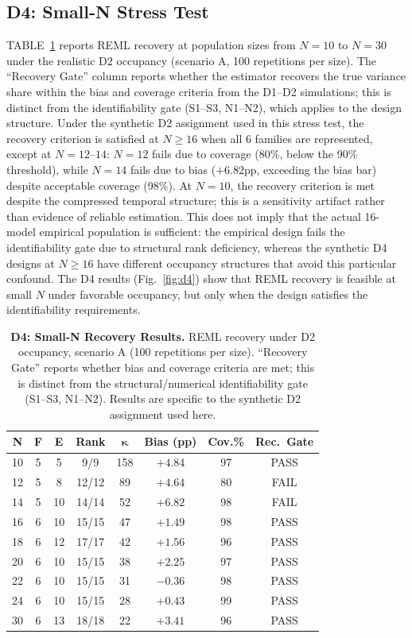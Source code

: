 \documentclass[11pt]{article}
\theoremstyle{definition}
\theoremstyle{plain}
\begin{document}
\subsection{D4: Small-N Stress Test}
TABLE~\ref{tab:d4} reports REML recovery at population sizes from $N = 10$ to $N = 30$ under the realistic D2 occupancy (scenario A, 100 repetitions per size). The ``Recovery Gate'' column reports whether the estimator recovers the true variance share within the bias and coverage criteria from the D1--D2 simulations; this is distinct from the identifiability gate (S1--S3, N1--N2), which applies to the design structure. Under the synthetic D2 assignment used in this stress test, the recovery criterion is satisfied at $N \geq 16$ when all 6 families are represented, except at $N = 12$--$14$: $N = 12$ fails due to coverage (80\%, below the 90\% threshold), while $N = 14$ fails due to bias ($+6.82$pp, exceeding the bias bar) despite acceptable coverage (98\%). At $N = 10$, the recovery criterion is met despite the compressed temporal structure; this is a sensitivity artifact rather than evidence of reliable estimation. This does not imply that the actual 16-model empirical population is sufficient: the empirical design fails the identifiability gate due to structural rank deficiency, whereas the synthetic D4 designs at $N \geq 16$ have different occupancy structures that avoid this particular confound. The D4 results (Fig.~\ref{fig:d4}) show that REML recovery is feasible at small $N$ under favorable occupancy, but only when the design satisfies the identifiability requirements.

\begin{table}[!htbp]
\caption{\textbf{D4: Small-N Recovery Results.} REML recovery under D2 occupancy, scenario A (100 repetitions per size). ``Recovery Gate'' reports whether bias and coverage criteria are met; this is distinct from the structural/numerical identifiability gate (S1--S3, N1--N2). Results are specific to the synthetic D2 assignment used here.}
\label{tab:d4}
\centering
\footnotesize
\begin{tabular}{c c c c c c c c}
\hline
\textbf{N} & \textbf{F} & \textbf{E} & \textbf{Rank} & $\boldsymbol{\kappa}$ & \textbf{Bias (pp)} & \textbf{Cov.\%} & \textbf{Rec.\ Gate} \\
\hline
10 & 5 & 5 & 9/9 & 158 & $+4.84$ & 97 & PASS \\
\hline
12 & 5 & 8 & 12/12 & 89 & $+4.64$ & 80 & FAIL \\
\hline
14 & 5 & 10 & 14/14 & 52 & $+6.82$ & 98 & FAIL \\
\hline
16 & 6 & 10 & 15/15 & 47 & $+1.49$ & 98 & PASS \\
\hline
18 & 6 & 12 & 17/17 & 42 & $+1.56$ & 96 & PASS \\
\hline
20 & 6 & 10 & 15/15 & 38 & $+2.25$ & 97 & PASS \\
\hline
22 & 6 & 10 & 15/15 & 31 & $-0.36$ & 98 & PASS \\
\hline
24 & 6 & 10 & 15/15 & 28 & $+0.43$ & 99 & PASS \\
\hline
30 & 6 & 13 & 18/18 & 22 & $+3.41$ & 96 & PASS \\
\hline
\end{tabular}
\end{table}
\end{document}
